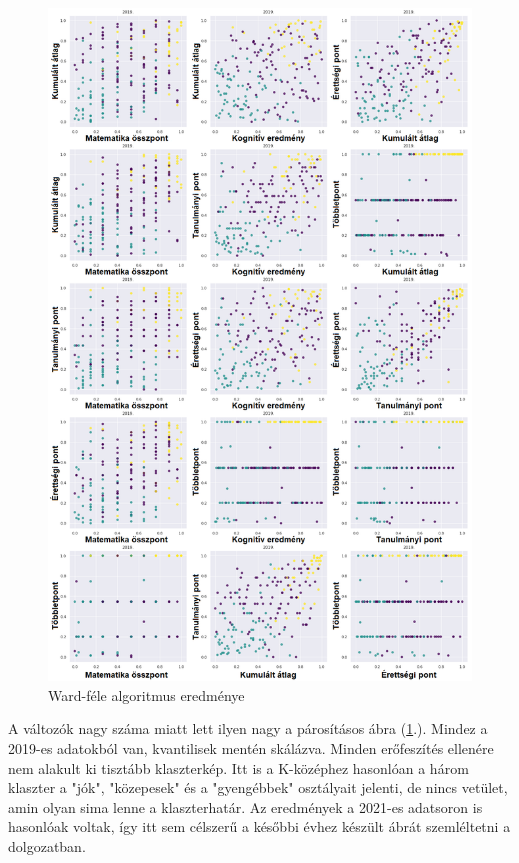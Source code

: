 \documentclass[12pt]{article}
\begin{document}
\begin{figure}[H]
\centering
\includegraphics[scale = 0.57]{kepek/klacterward.png}
\caption{Ward-féle algoritmus eredménye}
\label{fig:klacterward}
\end{figure}

A változók nagy száma miatt lett ilyen nagy a párosításos ábra (\ref{fig:klacterward}.). Mindez a 2019-es adatokból van, kvantilisek mentén skálázva. Minden erőfeszítés ellenére nem alakult ki tisztább klaszterkép. Itt is a K-középhez hasonlóan a három klaszter a "jók", "közepesek" és a "gyengébbek" osztályait jelenti, de nincs vetület, amin olyan sima lenne a klaszterhatár. Az eredmények a 2021-es adatsoron is hasonlóak voltak, így itt sem célszerű a későbbi évhez készült ábrát szemléltetni a dolgozatban.
\end{document}
